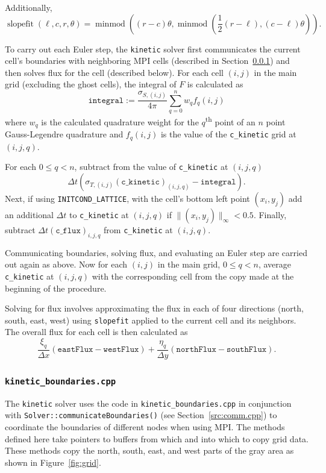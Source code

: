 \documentclass{article}
\newcommand{\assign}{\ensuremath{\mathrel{\texttt{:=}}}}
\DeclareMathOperator{\minmod}{minmod}
\DeclareMathOperator{\slopefit}{slopefit}
\newcommand{\kinetic}{\texttt{kinetic}\xspace}
\begin{document}
Additionally,
\begin{equation}
    \slopefit(\ell, c, r, \theta) = \minmod\left((r - c)\theta,
        \minmod\left(\frac{1}{2}(r - \ell), (c-\ell)\theta\right)\right).
\end{equation}

To carry out each Euler step, the \kinetic solver first communicates the current cell's
boundaries with neighboring MPI cells (described in
Section~\ref{src:kinetic_boundaries.cpp}) and then solves flux for the
cell (described below). For each cell $(i,j)$ in the main grid (excluding the ghost
cells), the integral of $F$ is calculated as
\begin{equation}
    \texttt{integral} \assign
    \frac{\sigma_{S,(i,j)}}{4\pi} \sum_{q=0}^n w_q f_q(i,j)
\end{equation}
where $w_q$ is the calculated quadrature weight for the $q$\textsuperscript{th} point
of an $n$ point Gauss-Legendre quadrature and
$f_q(i,j)$ is the value of the \texttt{c\_kinetic} grid at $(i,j,q)$.

For each $0 \leq q < n$, subtract from the value of \texttt{c\_kinetic} at $(i,j,q)$
\begin{equation} %
    \Delta t \left(\sigma_{T,(i,j)} (\mathtt{c\_kinetic})_{(i,j,q)} -
    \mathtt{integral}\right).
\end{equation}
Next, if using \texttt{INITCOND\_LATTICE}, with the cell's bottom left point
$(x_i,y_j)$ add an additional $\Delta t$ to \texttt{c\_kinetic} at $(i,j,q)$ if
$\|(x_i,y_j)\|_\infty < 0.5$. Finally, subtract $\Delta t (\mathtt{c\_flux})_{i,j,q}$
from \texttt{c\_kinetic} at $(i,j,q)$.

Communicating boundaries, solving flux, and evaluating an Euler step are carried out
again as above. Now for each $(i,j)$ in the main grid, $0 \leq q < n$, average
\texttt{c\_kinetic} at $(i,j,q)$ with the corresponding cell from the copy made at
the beginning of the procedure.

Solving for flux involves approximating the flux in each of four directions
(north, south, east, west) using
\texttt{slopefit} applied to the current cell and its neighbors. The overall flux for
each cell is then calculated as
\begin{equation}
    \frac{\xi_q}{\Delta x} (\mathtt{eastFlux} - \mathtt{westFlux}) +
    \frac{\eta_q}{\Delta y} (\mathtt{northFlux} - \mathtt{southFlux}).
\end{equation}

\subsubsection{\texttt{kinetic\_boundaries.cpp}}
\label{src:kinetic_boundaries.cpp}
The \kinetic solver uses the code in \texttt{kinetic\_boundaries.cpp} in
conjunction with \texttt{Solver::communicateBoundaries()}
(see Section~\ref{src:comm.cpp}) to coordinate the boundaries of different nodes
when using MPI.
The methods defined here take pointers to buffers from which and into which to copy
grid data. These methods copy the north, south, east, and west parts of the gray
area as shown in Figure~\ref{fig:grid}.
\end{document}
